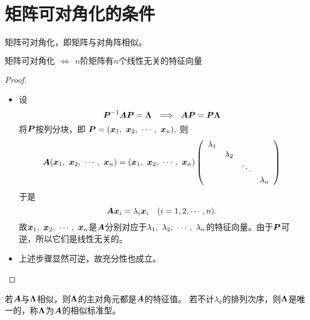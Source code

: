 \section{矩阵可对角化的条件}
\begin{frame}[fragile]\ft{\secname}
矩阵可对角化，即矩阵与对角阵相似。    
\end{frame}

\begin{frame}[fragile]\ft{\secname}

\begin{dingli}
  $\mbox{矩阵可对角化} ~~\Longleftrightarrow~~
  \mbox{$n$阶矩阵有$n$个线性无关的特征向量}$ 
\end{dingli}
\end{frame}

\begin{frame}[fragile]\ft{\secname}
\begin{proof}
\begin{itemize}
\item[\blue{($\Rightarrow$)}] 设
  $$
  \boldsymbol{P}^{-1}\boldsymbol{A}\boldsymbol{P}=\boldsymbol{\Lambda}  ~~\Longrightarrow~~
  \boldsymbol{A}\boldsymbol{P}=\boldsymbol{P}\boldsymbol{\Lambda}
  $$
  将$\boldsymbol{P}$按列分块，即
  $
  \boldsymbol{P}=({\boldsymbol{x}}_1,~{\boldsymbol{x}}_2,~\cdots,~{\boldsymbol{x}}_n),
  $
  则
  $$
  \boldsymbol{A}({\boldsymbol{x}}_1,~{\boldsymbol{x}}_2,~\cdots,~{\boldsymbol{x}}_n)=({\boldsymbol{x}}_1,~{\boldsymbol{x}}_2,~\cdots,~{\boldsymbol{x}}_n)\left(
    \begin{array}{cccc}
      \lambda_1&&&\\
               &\lambda_2&&\\
               &&\ddots&\\
               &&&\lambda_n
    \end{array}
  \right)
  $$
  于是
  $$
  \boldsymbol{A}{\boldsymbol{x}}_i=\lambda_i{\boldsymbol{x}}_i\quad(i=1,2,\cdots,n).
  $$
  故${\boldsymbol{x}}_1,~{\boldsymbol{x}}_2,~\cdots,~{\boldsymbol{x}}_n$是$\boldsymbol{A}$分别对应于$\lambda_1,~\lambda_2,~\cdots,~\lambda_n$的特征向量。由于$\boldsymbol{P}$可逆，所以它们是线性无关的。
  \item[\blue{($\Leftarrow$)}] 上述步骤显然可逆，故充分性也成立。
\end{itemize}
\end{proof}





\end{frame}

\begin{frame}[fragile]\ft{\secname}

若$\boldsymbol{A}$与$\boldsymbol{\Lambda}$相似，则$\boldsymbol{\Lambda}$的主对角元都是$\boldsymbol{A}$的特征值。
若不计$\lambda_k$的排列次序，则$\boldsymbol{\Lambda}$是唯一的，称$\boldsymbol{\Lambda}$为$\boldsymbol{A}$的相似标准型。




\end{frame}

